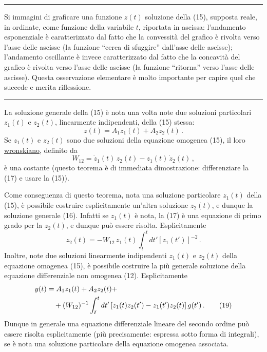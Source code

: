 \documentclass[11pt, a4paper]{book}
\numberwithin{equation}{section}
\begin{document}
\noindent\rule{\textwidth}{0.4pt}
\begin{small}
Si immagini di graficare una funzione $z(t)$ soluzione della (15), supposta
reale, in ordinate, come funzione della variabile $t$, riportata in ascissa:
l'andamento esponenziale è caratterizzato dal fatto che la convessità del
grafico è rivolta verso l'asse delle ascisse (la funzione ``cerca di sfuggire''
dall'asse delle ascisse); l'andamento oscillante è invece caratterizzato dal
fatto che la concavità del grafico è rivolta verso l'asse delle ascisse (la
funzione ``ritorna'' verso l'asse delle ascisse). Questa osservazione elementare
è molto importante per capire quel che succede e merita riflessione.
\end{small}
\noindent\rule{\textwidth}{0.4pt}

La soluzione generale della (15) è nota una volta note due soluzioni particolari
$z_1(t)$ e $z_2(t)$, linearmente indipendenti, della (15) stessa:
\begin{equation}
    z(t) = A_1 z_1(t) + A_2 z_2(t) \,. \tag{16}
\end{equation}
Se $z_1(t)$ e $z_2(t)$ sono due soluzioni della equazione omogenea (15), il loro
\uline{wronskiano}, definito da
\begin{equation}
    W_{12} = \dot{z}_1(t) \, z_2(t) - z_1(t) \, \dot{z}_2(t) \,, \tag{17}
\end{equation}
è una costante (questo teorema è di immediata dimostrazione: differenziare la
(17) e usare la (15)).

Come conseguenza di questo teorema, nota una soluzione particolare $z_1(t)$
della (15), è possibile costruire esplicitamente un'altra soluzione $z_2(t)$, e
dunque la soluzione generale (16). Infatti se $z_1(t)$ è nota, la (17) è una
equazione di primo grado per la $z_2(t)$, e dunque può essere risolta.
Esplicitamente
\begin{equation}
    z_2(t) = -W_{12} \, z_1(t) \int_{\bar{t}}^{t} dt' \left[ z_1(t') \right]^{-2} \,. \tag{18}
\end{equation}
Inoltre, note due soluzioni linearmente indipendenti $z_1(t)$ e $z_2(t)$ della
equazione omogenea (15), è possibile costruire la più generale soluzione della
equazione differenziale non omogenea (12). Esplicitamente
\begin{align}
    y(t) &= A_1 z_1(t) + A_2 z_2(t) + \notag \\
    &\quad + (W_{12})^{-1} \int_{\bar{t}}^{t} dt' \left[ z_1(t) z_2(t') - z_1(t') z_2(t) \right] g(t') \,. \tag{19}
\end{align}
Dunque in generale una equazione differenziale lineare del secondo ordine può
essere risolta esplicitamente (più precisamente: espressa sotto forma di
integrali), se è nota una soluzione particolare della equazione omogenea
associata.
\end{document}
